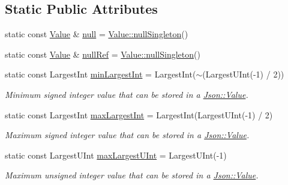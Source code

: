 \subsection*{Static Public Attributes}
\begin{DoxyCompactItemize}
\item 
static const \hyperlink{classJson_1_1Value}{Value} \& \hyperlink{classJson_1_1Value_a21ddb05b92c60c7548e928bf371e7d45}{null} = \hyperlink{classJson_1_1Value_af2f124567acc35d021a424e53ebdfcab}{Value\+::null\+Singleton}()
\item 
static const \hyperlink{classJson_1_1Value}{Value} \& \hyperlink{classJson_1_1Value_aaee27e622f87266f861216d644603730}{null\+Ref} = \hyperlink{classJson_1_1Value_af2f124567acc35d021a424e53ebdfcab}{Value\+::null\+Singleton}()
\item 
\mbox{\label{classJson_1_1Value_af91df130daa50dd43d2cd89e6ee67706}} 
static const Largest\+Int \hyperlink{classJson_1_1Value_af91df130daa50dd43d2cd89e6ee67706}{min\+Largest\+Int} = Largest\+Int($\sim$(Largest\+U\+Int(-\/1) / 2))
\begin{DoxyCompactList}\small\item\em Minimum signed integer value that can be stored in a \hyperlink{classJson_1_1Value}{Json\+::\+Value}. \end{DoxyCompactList}\item 
\mbox{\label{classJson_1_1Value_a8b4977696f13296fa8755c7953fafb2f}} 
static const Largest\+Int \hyperlink{classJson_1_1Value_a8b4977696f13296fa8755c7953fafb2f}{max\+Largest\+Int} = Largest\+Int(Largest\+U\+Int(-\/1) / 2)
\begin{DoxyCompactList}\small\item\em Maximum signed integer value that can be stored in a \hyperlink{classJson_1_1Value}{Json\+::\+Value}. \end{DoxyCompactList}\item 
\mbox{\label{classJson_1_1Value_a8ddb32d9d55fa5323ae5135639dc2e31}} 
static const Largest\+U\+Int \hyperlink{classJson_1_1Value_a8ddb32d9d55fa5323ae5135639dc2e31}{max\+Largest\+U\+Int} = Largest\+U\+Int(-\/1)
\begin{DoxyCompactList}\small\item\em Maximum unsigned integer value that can be stored in a \hyperlink{classJson_1_1Value}{Json\+::\+Value}. \end{DoxyCompactList}\item 

\end{DoxyCompactItemize}
